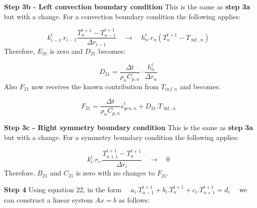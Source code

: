 \documentclass[11pt,letterpaper,titlepage]{article}
\begin{document}
\vspace{0.5cm}\noindent
\textbf{Step 3b - Left convection boundary condition}\newline
This is the same as \textbf{step 3a} but with a change. For a convection boundary condition the following applies:

\begin{equation*}
k_{i-1}^t.r_{i-1} \frac{T_{n}^{t+1} - T_{n-1}^{t+1}}{\Delta r_{i-1}} \quad \to \quad h_n^t.r_n (T_{n}^{t+1}-T_{\inf,n})
\end{equation*}
\newline
Therefore, $E_{21}$ is zero and $D_{21}$ becomes:

\begin{equation*}
D_{21}=\frac{\Delta t}{\rho_n C_{p,n}} \cdot \frac{h_n^t}{\Delta r_n}
\end{equation*}
\newline 
Also $F_{21}$ now receives the known contribution from $T_{inf,n}$ and becomes:

\begin{equation*}
F_{21}=\frac{\Delta t}{\rho_n C_{p,n}} \dot{e}_{gen,n}^t + D_{21}.T_{\inf,n}
\end{equation*}




\vspace{0.5cm}\noindent
\textbf{Step 3c - Right symmetry boundary condition}\newline
This is the same as \textbf{step 3a} but with a change. For a symmetry boundary condition the following applies:

\begin{equation*}
k_i^t.r_i. \frac{T_{n+1}^{t+1} - T_{n}^{t+1}}{\Delta r_i} \quad \to \quad 0 
\end{equation*}
\newline
Therefore, $B_{21}$ and $C_{21}$ is zero with no changes to $F_{21}$.






\newpage
\vspace{0.5cm}\noindent
\textbf{Step 4}\newline
Using equation 22, in the form $\quad a_i.T_{n-1}^{t+1} + b_i.T_{n}^{t+1} + c_i.T_{n+1}^{t+1} = d_i \quad $ we can construct a linear system $Ax=b$ as follows:
\end{document}

